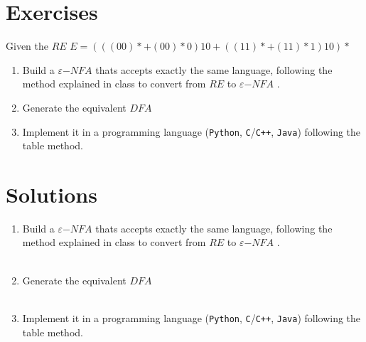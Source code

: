 \documentclass[a4paper]{article}
\newcommand{\ENFA}{{\Large $\varepsilon$}$-NFA$ }
\begin{document}
\maketitle
\newpage

\section{Exercises}
  Given the $RE$ $E=(((00)*+(00)*0)10 + ((11)*+(11)*1)10)*$
  \begin{enumerate}
    \item Build a \ENFA thats accepts exactly the same
          language, following the method explained in class to convert from
          $RE$ to \ENFA.
    \item Generate the equivalent $DFA$
    \item Implement it in a programming language (\verb!Python!,
          \verb!C!/\verb!C++!, \verb!Java!) following the table method.
  \end{enumerate}

\section{Solutions}
  \begin{enumerate}
    \item Build a \ENFA thats accepts exactly the same
          language, following the method explained in class to convert from
          $RE$ to \ENFA. \\ \\
          
    \newpage
    \item Generate the equivalent $DFA$ \\ \\
          
    \newpage
    \item Implement it in a programming language (\verb!Python!,
          \verb!C!/\verb!C++!, \verb!Java!) following the table method. \\ \\
          

  \end{enumerate}
\end{document}
